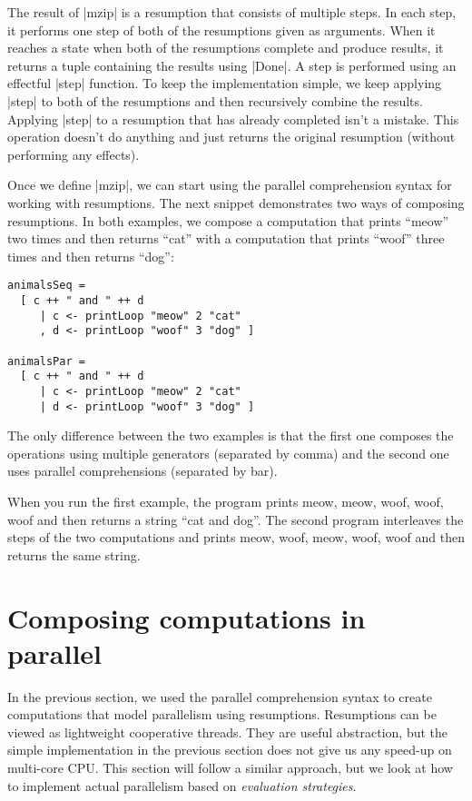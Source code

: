 \documentclass{tmr}
\begin{document}
The result of |mzip| is a resumption that consists of multiple steps. In each step, it performs
one step of both of the resumptions given as arguments. When it reaches a state when both of the
resumptions complete and produce results, it returns a tuple containing the results using |Done|.
A step is performed using an effectful |step| function. To keep the implementation simple, we keep
applying |step| to both of the resumptions and then recursively combine the results. Applying
|step| to a resumption that has already completed isn't a mistake. This operation doesn't do 
anything and just returns the original resumption (without performing any effects).

Once we define |mzip|, we can start using the parallel comprehension syntax for working with 
resumptions. The next snippet demonstrates two ways of composing resumptions. In both examples, we 
compose a computation that prints ``meow'' two times and then returns ``cat'' with a computation 
that prints ``woof'' three times and then returns ``dog'':

\begin{verbatim}
animalsSeq = 
  [ c ++ " and " ++ d
     | c <- printLoop "meow" 2 "cat" 
     , d <- printLoop "woof" 3 "dog" ]

animalsPar = 
  [ c ++ " and " ++ d
     | c <- printLoop "meow" 2 "cat" 
     | d <- printLoop "woof" 3 "dog" ]
\end{verbatim}
The only difference between the two examples is that the first one composes the operations using 
multiple generators (separated by comma) and the second one uses parallel comprehensions (separated
by bar).

When you run the first example, the program prints meow, meow, woof, woof, woof and then returns 
a string ``cat and dog''. The second program interleaves the steps of the two computations and 
prints meow, woof, meow, woof, woof and then returns the same string.	


\section{Composing computations in parallel}

In the previous section, we used the parallel comprehension syntax to create computations that 
model parallelism using resumptions. Resumptions can be viewed as lightweight cooperative threads.
They are useful abstraction, but the simple implementation in the previous section does not give
us any speed-up on multi-core CPU. This section will follow a similar approach, but we look at how 
to implement actual parallelism based on \textit{evaluation strategies}. 
\end{document}
